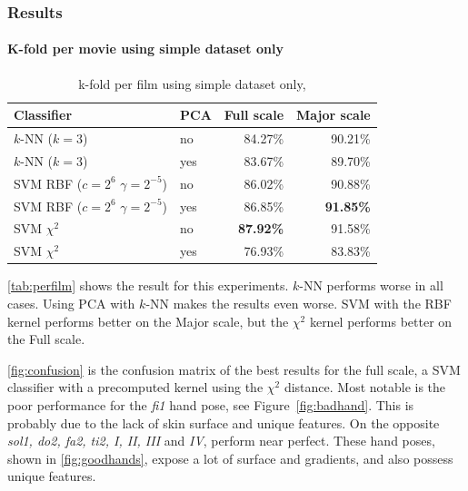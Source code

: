 \subsubsection{Results}

\paragraph{K-fold per movie using simple dataset only}


\begin{table}
\centering
\begin{tabular}{llrr}
\hline\hline
Classifier 		& PCA		&  	Full scale	& Major scale	\\
\hline
$k$-NN ($k=3$)	&	no	&  	84.27\%		& 90.21\%		\\
$k$-NN ($k=3$) 	&	yes	& 	83.67\%		& 89.70\%		\\
SVM RBF ($c=2^6$ $\gamma=2^{-5}$)		&	no	&	86.02\%	& 90.88\% \\
SVM RBF ($c=2^6$ $\gamma=2^{-5}$)		&	yes	& 	86.85\% & \textbf{91.85\%} \\
SVM $\chi^2$ &	no	&	\textbf{87.92\%}		& 91.58\% \\
SVM $\chi^2$ &	yes	&	76.93\%	& 83.83\% \\
\hline
\end{tabular}
\caption{k-fold per film using simple dataset only,}
\label{tab:perfilm}
\end{table}

\autoref{tab:perfilm} shows the result for this experiments. $k$-NN performs worse in all cases. Using PCA with $k$-NN makes the results even worse. SVM with the RBF kernel performs better on the Major scale, but the $\chi^2$ kernel performs better on the Full scale. 

\autoref{fig:confusion} is the confusion matrix of the best results for the full scale, a SVM classifier with a precomputed kernel using the $\chi^2$ distance. Most notable is the poor performance for the \emph{fi1} hand pose, see Figure~\ref{fig:badhand}. This is probably due to the lack of skin surface and unique features. On the opposite \emph{sol1, do2, fa2, ti2, I, II, III }and \emph{IV}, perform near perfect. These hand poses, shown in \autoref{fig:goodhands}, expose a lot of surface and gradients, and also possess unique features.


